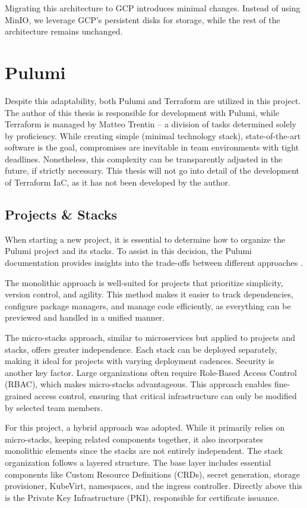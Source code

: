 Migrating this architecture to GCP introduces minimal changes. Instead of using MinIO, we leverage GCP's persistent disks for storage, while the rest of the architecture remains unchanged.

\section{Pulumi}
Despite this adaptability, both Pulumi and Terraform are utilized in this project. The author of this thesis is responsible for development with Pulumi, while Terraform is managed by Matteo Trentin -- a division of tasks determined solely by proficiency. While creating simple (minimal technology stack), state-of-the-art software is the goal, compromises are inevitable in team environments with tight deadlines. Nonetheless, this complexity can be transparently adjusted in the future, if strictly necessary. This thesis will not go into detail of the development of Terraform IaC, as it has not been developed by the author.

\subsection{Projects \& Stacks}
When starting a new project, it is essential to determine how to organize the Pulumi project and its stacks. To assist in this decision, the Pulumi documentation provides insights into the trade-offs between different approaches \Parencite{pulumiProjects2025}.

The monolithic approach is well-suited for projects that prioritize simplicity, version control, and agility. This method makes it easier to track dependencies, configure package managers, and manage code efficiently, as everything can be previewed and handled in a unified manner.

The micro-stacks approach, similar to microservices but applied to projects and stacks, offers greater independence. Each stack can be deployed separately, making it ideal for projects with varying deployment cadences. Security is another key factor. Large organizations often require Role-Based Access Control (RBAC), which makes micro-stacks advantageous. This approach enables fine-grained access control, ensuring that critical infrastructure can only be modified by selected team members.

For this project, a hybrid approach was adopted. While it primarily relies on micro-stacks, keeping related components together, it also incorporates monolithic elements since the stacks are not entirely independent. The stack organization follows a layered structure. The base layer includes essential components like Custom Resource Definitions (CRDs), secret generation, storage provisioner, KubeVirt, namespaces, and the ingress controller. Directly above this is the Private Key Infrastructure (PKI), responsible for certificate issuance. 

